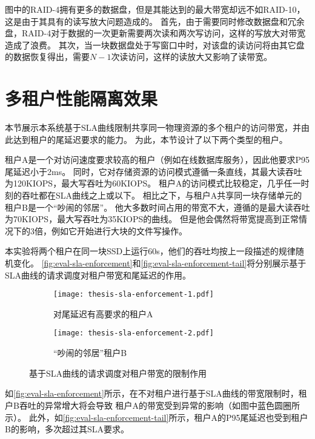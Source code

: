 图中的RAID-4拥有更多的数据盘，但是其能达到的最大带宽却远不如RAID-10，这是由于其具有的读写放大问题造成的。
首先，由于需要同时修改数据盘和冗余盘，RAID-4对于数据的一次更新需要两次读和两次写访问，这样的写放大对带宽造成了浪费。
其次，当一块数据盘处于写窗口中时，对该盘的读访问将由其它盘的数据恢复得出，需要$N - 1$次读访问，这样的读放大又影响了读带宽。

\section{多租户性能隔离效果}
\label{sec:eval-sla-enforcement}

本节展示本系统基于SLA曲线限制共享同一物理资源的多个租户的访问带宽，并由此达到租户的尾延迟要求的能力。
为此，本节设计了以下两个类型的租户。

租户A是一个对访问速度要求较高的租户（例如在线数据库服务），因此他要求P95尾延迟小于2ms。
同时，它对存储资源的访问模式遵循一条直线，其最大读吞吐为120KIOPS，最大写吞吐为60KIOPS。
租户A的访问模式比较稳定，几乎任一时刻的吞吐都在SLA曲线之上或以下。
相比之下，与租户A共享同一块存储单元的租户B是一个“吵闹的邻居”。
他大多数时间占用的带宽不大，遵循的是最大读吞吐为70KIOPS，最大写吞吐为35KIOPS的曲线。
但是他会偶然将带宽提高到正常情况下的3倍，例如它开始进行大块的文件写操作。

本实验将两个租户在同一块SSD上运行60s，他们的吞吐均按上一段描述的规律随机变化。
\autoref{fig:eval-sla-enforcement}和\autoref{fig:eval-sla-enforcement-tail}将分别展示基于SLA曲线的请求调度对租户带宽和尾延迟的作用。

\begin{figure}[h]
  \centering
  \begin{subfigure}[b]{0.48\textwidth}
    \centering
    \texttt{[image: thesis-sla-enforcement-1.pdf]}
    \caption{对尾延迟有高要求的租户A}
    \label{fig:eval-sla-enforcement-a}
  \end{subfigure}
  \begin{subfigure}[b]{0.48\textwidth}
    \centering
    \texttt{[image: thesis-sla-enforcement-2.pdf]}
    \caption{“吵闹的邻居”租户B}
    \label{fig:eval-sla-enforcement-b}
  \end{subfigure}
  \caption{基于SLA曲线的请求调度对租户带宽的限制作用}
  \label{fig:eval-sla-enforcement}
\end{figure}

如\autoref{fig:eval-sla-enforcement}所示，在不对租户进行基于SLA曲线的带宽限制时，租户B吞吐的异常增大将会导致
租户A的带宽受到异常的影响（如图中蓝色圆圈所示）。
此外，如\autoref{fig:eval-sla-enforcement-tail}所示，租户A的P95尾延迟也受到租户B的影响，多次超过其SLA要求。

